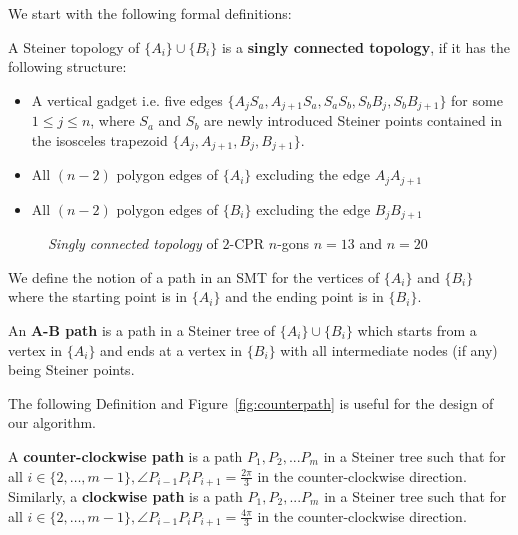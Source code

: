 We start with the following formal definitions:

\begin{definition}\label{def:singly-conn}
A Steiner topology of $\{A_i\} \cup \{B_i\}$ is a \textbf{singly connected topology}, if it has the following structure:

\begin{itemize}
    \item A vertical gadget i.e.  five edges $\{A_jS_a, A_{j + 1}S_a, S_aS_b, S_bB_j, S_bB_{j + 1}\}$ for some $1 \le j \le n$, where $S_a$ and $S_b$ are newly introduced Steiner points contained in the isosceles trapezoid $\{A_j, A_{j + 1}, B_j, B_{j + 1}\}$. 
    \item All $(n - 2)$ polygon edges of $\{A_i\}$ excluding the edge $A_jA_{j + 1}$
    \item All $(n - 2)$ polygon edges of $\{B_i\}$ excluding the edge $B_jB_{j + 1}$
\end{itemize} 
\end{definition}


\begin{figure}[h]
\centering
{}
    \qquad
{}
\caption{ \emph{Singly connected topology} of $2$-CPR $n$-gons $n = 13$ and $n = 20$ }
\label{sing_con_top_fig}
\end{figure}

We define the notion of a path in an SMT for the vertices of $\{A_i\}$ and $\{B_i\}$ where the starting point is in $\{A_i\}$ and the ending point is in $\{B_i\}$.
\begin{definition}
    An \textbf{A-B path} is a path in a Steiner tree of $\{A_i\} \cup \{B_i\}$ which starts from a vertex in $\{A_i\}$ and ends at a vertex in $\{B_i\}$ with all intermediate nodes (if any) being Steiner points. 
\end{definition}

The following Definition and Figure~\ref{fig:counterpath} is useful for the design of our algorithm.
\begin{definition}\label{def:cw_ccw_path}
    A \textbf{counter-clockwise path} is a path $P_1, P_2, ... P_m$ in a Steiner tree such that for all $i \in \{2, \ldots, m - 1\}, \angle P_{i - 1}P_{i}P_{i + 1} = \frac{2 \pi}{3}$ in the counter-clockwise direction. Similarly, a \textbf{clockwise path} is a path $P_1, P_2, ... P_m$ in a Steiner tree such that for all $i \in \{2, \ldots, m - 1\}, \angle P_{i - 1}P_{i}P_{i + 1} = \frac{4 \pi}{3}$ in the counter-clockwise direction.
\end{definition}


